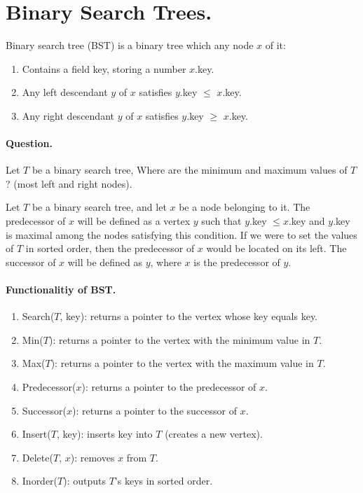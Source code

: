 \section{Binary Search Trees.} Binary search tree (BST) is a binary tree which any node $x$ of it: 
\begin{enumerate}
  \item Contains a field key, storing a number $x$.key. 
  \item Any left descendant $y$ of $x$ satisfies $y$.key $\le$ $x$.key. 
  \item Any right descendant $y$ of $x$ satisfies $y$.key $\ge$ $x$.key. 
\end{enumerate}

\paragraph{Question.} Let $T$ be a binary search tree, Where are the minimum and maximum values of $T$? (most left and right nodes). 

\begin{definition}
Let $T$ be a binary search tree, and let $x$ be a node belonging to it. The predecessor of $x$ will be defined as a vertex $y$ such that $y$.key $\leq x$.key and $y$.key is maximal among the nodes satisfying this condition. If we were to set the values of $T$ in sorted order, then the predecessor of $x$ would be located on its left. The successor of $x$ will be defined as $y$, where $x$ is the predecessor of $y$.
\end{definition}

\paragraph{Functionalitiy of BST.}
\begin{enumerate}
\item Search($T$, key): returns a pointer to the vertex whose key equals key. 
  \item Min($T$): returns a pointer to the vertex with the minimum value in $T$.  
  \item Max($T$): returns a pointer to the vertex with the maximum value in $T$.  
  \item Predecessor($x$): returns a pointer to the predecessor of $x$.  
  \item Successor($x$): returns a pointer to the successor of $x$. 
  \item Insert($T$, key): inserts key into $T$ (creates a new vertex).   
  \item Delete($T$, $x$): removes $x$ from $T$. 
  \item Inorder($T$): outputs $T$'s keys in sorted order.

\end{enumerate}


